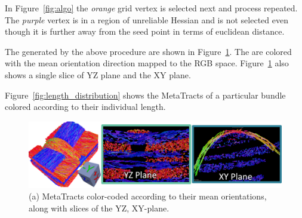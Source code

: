 In Figure~\ref{fig:algo} the \textit{orange} grid vertex is selected next and process repeated. The \textit{purple} vertex is in a region of unreliable Hessian and is not selected even though it is further away from the seed point in terms of euclidean distance. 

The \mt generated by the above procedure are shown in Figure~\ref{fig:metaTracts}. The \mt are colored with the mean orientation direction mapped to the RGB space. Figure~\ref{fig:metaTracts} also shows a single slice of YZ plane and the XY plane. 


Figure~\ref{fig:length_distribution} shows the MetaTracts of a particular bundle colored according to their individual length.

\begin{figure}[htb]
\centering
	\includegraphics[width=\linewidth]{images/metaTracts.eps}
	\caption{(a) MetaTracts color-coded according to their mean orientations, along with slices of the YZ, XY-plane.}
	\label{fig:metaTracts}
\end{figure}

